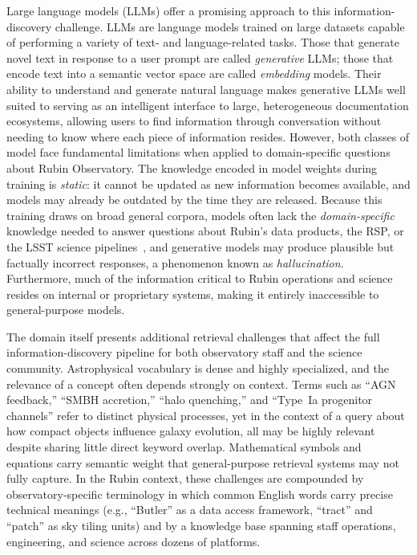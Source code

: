 Large language models (LLMs) offer a promising approach to this information-discovery challenge.
LLMs are language models trained on large datasets capable of performing a variety of text- and language-related tasks.
Those that generate novel text in response to a user prompt are called \emph{generative} LLMs; those that encode text into a semantic vector space are called \emph{embedding} models.
Their ability to understand and generate natural language makes generative LLMs well suited to serving as an intelligent interface to large, heterogeneous documentation ecosystems, allowing users to find information through conversation without needing to know where each piece of information resides.
However, both classes of model face fundamental limitations when applied to domain-specific questions about Rubin Observatory.
The knowledge encoded in model weights during training is \emph{static}: it cannot be updated as new information becomes available, and models may already be outdated by the time they are released.
Because this training draws on broad general corpora, models often lack the \emph{domain-specific} knowledge needed to answer questions about Rubin's data products, the \gls{RSP}, or the \gls{LSST} science pipelines~\cite{PSTN-019}, and generative models may produce plausible but factually incorrect responses, a phenomenon known as \emph{hallucination}.
Furthermore, much of the information critical to Rubin operations and science resides on internal or proprietary systems, making it entirely inaccessible to general-purpose models.

The domain itself presents additional retrieval challenges that affect the full information-discovery pipeline for both observatory staff and the science community.
Astrophysical vocabulary is dense and highly specialized, and the relevance of a concept often depends strongly on context.
Terms such as ``AGN feedback,'' ``SMBH accretion,'' ``halo quenching,'' and ``Type~Ia progenitor channels'' refer to distinct physical processes, yet in the context of a query about how compact objects influence galaxy evolution, all may be highly relevant despite sharing little direct keyword overlap.
Mathematical symbols and equations carry semantic weight that general-purpose retrieval systems may not fully capture.
In the Rubin context, these challenges are compounded by observatory-specific terminology in which common English words carry precise technical meanings (e.g., ``Butler'' as a data access framework, ``tract'' and ``patch'' as sky tiling units) and by a knowledge base spanning staff operations, engineering, and science across dozens of platforms.

